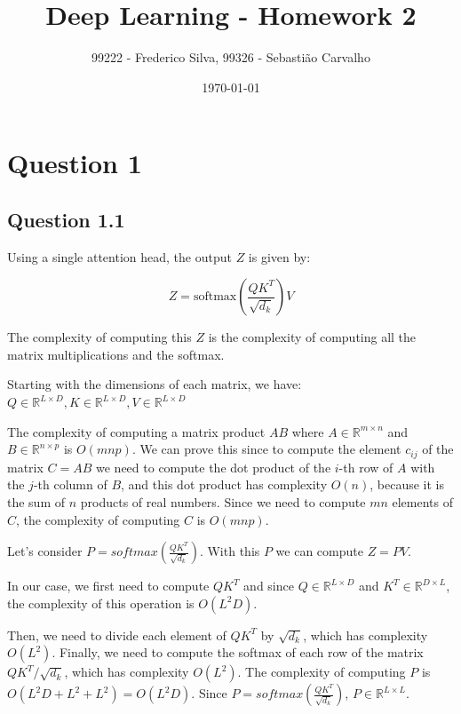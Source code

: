 \documentclass{article}
\title{Deep Learning - Homework 2}
\author{99222 - Frederico Silva, 99326 - Sebastião Carvalho}
\date{\today}
\begin{document}
\maketitle

\tableofcontents

\section{Question 1}

\subsection{Question 1.1}

Using a single attention head, the output $Z$ is given by:

\begin{equation}
    Z = \text{softmax} \left( \frac{QK^T}{\sqrt{d_k}} \right) V
\end{equation}

The complexity of computing this $Z$ is the complexity of computing all the matrix multiplications and the softmax.

Starting with the dimensions of each matrix, we have:
$
    Q \in \mathbb{R}^{L \times D}, K \in \mathbb{R}^{L \times D}, V \in \mathbb{R}^{L \times D}
$

\bigskip

The complexity of computing a matrix product $AB$ where $A \in \mathbb{R}^{m \times n}$ and $B \in \mathbb{R}^{n \times p}$ is $O(mnp)$.
We can prove this since to compute the element $c_{ij}$ of the matrix $C = AB$ we need to compute the dot product of the $i$-th row of 
$A$ with the $j$-th column of $B$, and this dot product has complexity $O(n)$, because it is the sum of $n$ products of real numbers.
Since we need to compute $mn$ elements of $C$, the complexity of computing $C$ is $O(mnp)$.

\bigskip

Let's consider $P = softmax \left( \frac{QK^T}{\sqrt{d_k}} \right)$. With this $P$ we can compute $Z = PV$.

In our case, we first need to compute $QK^T$ and since $Q \in \mathbb{R}^{L \times D}$ and $K^T \in \mathbb{R}^{D \times L}$, 
the complexity of this operation is $O(L^2D)$.

Then, we need to divide each element of $QK^T$ by $\sqrt{d_k}$, which has complexity $O(L^2)$.
Finally, we need to compute the softmax of each row of the matrix $QK^T / \sqrt{d_k}$, which has complexity $O(L^2)$.
The complexity of computing $P$ is $O(L^2D + L^2 + L^2) = O(L^2D)$. 
Since $P = softmax \left( \frac{QK^T}{\sqrt{d_k}} \right)$, $P \in \mathbb{R}^{L \times L}$.
\end{document}
